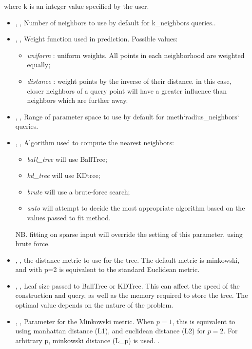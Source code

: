 where k is an integer value specified by the user.
%
\begin{itemize}
  \item {} , ,
  Number of neighbors to use by default for k\_neighbors queries..
  \item {} , ,
  Weight function used in prediction.
  Possible values:
\begin{itemize}
    \item \textit{uniform} : uniform weights.
    All points in each neighborhood are weighted equally;
    \item \textit{distance} : weight points by the inverse of their distance.
    in this case, closer neighbors of a query point will have a greater
    influence than neighbors which are further away.
\end{itemize}

  \item {} , ,
  Range of parameter space to use by default for :meth`radius\_neighbors`
  queries.
  \item {} , ,
  Algorithm used to compute the nearest neighbors:
\begin{itemize}
    \item \textit{ball\_tree} will use BallTree;
    \item \textit{kd\_tree} will use KDtree;
    \item \textit{brute} will use a brute-force search;
    \item \textit{auto} will attempt to decide the most appropriate algorithm
    based on the values passed to fit method.
\end{itemize}
  NB.
  fitting on sparse input will override the setting of this parameter, using
  brute force.
  \item {} , ,
  the distance metric to use for the tree.
  The default metric is minkowski, and with p=2 is equivalent to the standard
  Euclidean metric.
  \item {} , ,
  Leaf size passed to BallTree or KDTree.
  This can affect the speed of the construction and query, as well as the memory
  required to store the tree.
  The optimal value depends on the nature of the problem.
  \item {} , ,
  Parameter for the Minkowski metric.
  When $p = 1$, this is equivalent to using manhattan distance (L1), and
  euclidean distance (L2) for $p = 2$.
  For arbitrary p, minkowski distance (L\_p) is used.
  .
\end{itemize}
